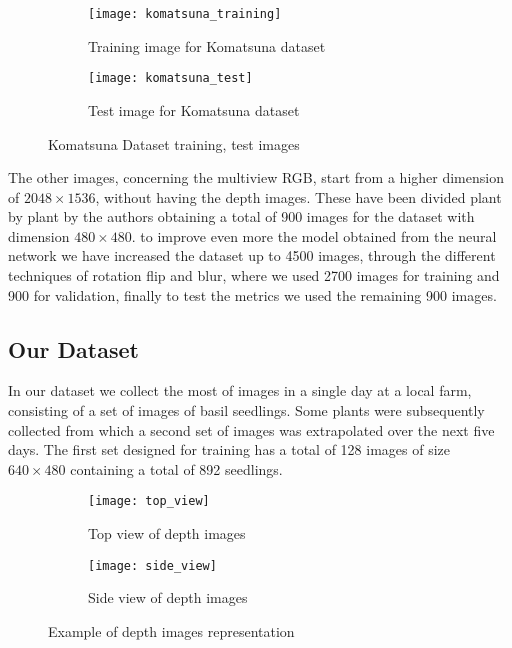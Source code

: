 \begin{figure}[ht] 
  \centering
  \begin{subfigure}{.5\textwidth}
    \centering
    \texttt{[image: komatsuna\_training]}
    \caption{Training image for Komatsuna dataset}
    \label{fig:sub3}
  \end{subfigure}%
  \begin{subfigure}{.5\textwidth}
    \centering
    \texttt{[image: komatsuna\_test]}
    \caption{Test image for Komatsuna dataset}
    \label{fig:sub4}
  \end{subfigure}
  \caption{Komatsuna Dataset training, test images}
  \label{fig:komatsuna}
\end{figure}


The other images, concerning the multiview RGB, start from a higher dimension of $2048\times 1536$, without having the depth images. These have been divided plant by plant by
the authors obtaining a total of 900 images for the dataset with dimension $480\times480$. to improve even more the model obtained from the neural network we have increased
the dataset up to 4500 images, through the different techniques of rotation flip and blur, where we used 2700 images for training and 900 for validation, finally to test
the metrics we used the remaining 900 images.


\subsection{Our Dataset}
In our dataset we collect the most of images in a single day at a local farm, consisting of a set of images of basil seedlings. Some plants were subsequently collected
from which a second set of images was extrapolated over the next five days. The first set designed for training has a total of 128 images of size $640\times 480$
containing a total of 892 seedlings. 

\begin{figure}[ht] 
  \centering
  \begin{subfigure}{.5\textwidth}
    \centering
    \texttt{[image: top\_view]}
    \caption{Top view of depth images}
  \end{subfigure}%
  \begin{subfigure}{.5\textwidth}
    \centering
    \texttt{[image: side\_view]}
    \caption{Side view of depth images}
  \end{subfigure}
  \caption{Example of depth images representation}
\end{figure}

